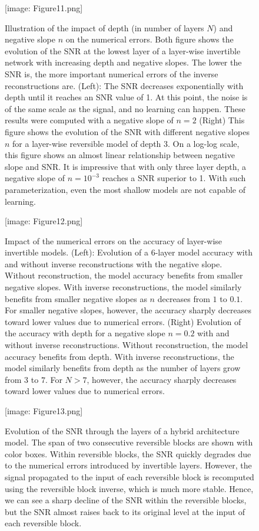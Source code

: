 \documentclass[twocolumn]{bmcart}
\def\texttt{[image: ]}
\begin{document}
\begin{backmatter}
\begin{figure}[t]
\texttt{[image: Figure11.png]}
\caption{
Illustration of the impact of depth (in number of layers $N$) and negative slope $n$ on the numerical errors.
Both figure shows the evolution of the SNR at the lowest layer of a layer-wise invertible network with increasing depth and negative slopes.
The lower the SNR is, the more  important numerical errors of the inverse reconstructions are. 
(Left): The SNR decreases exponentially with depth until it reaches an SNR value of 1. 
At this point, the noise is of the same scale as the signal, and no learning can happen.
These results were computed with a negative slope of $n=2$
(Right) This figure shows the evolution of the SNR with different negative slopes $n$ for a layer-wise reversible model of depth 3.
On a log-log scale, this figure shows an almost linear relationship between negative slope and SNR.
It is impressive that with only three layer depth, a negative slope of $n=10^{-3}$ reaches a SNR superior to 1.
With such parameterization, even the most shallow models are not capable of learning.
}
\end{figure}

\begin{figure}[t]
\texttt{[image: Figure12.png]}
\caption{
Impact of the numerical errors on the accuracy of layer-wise invertible models.
(Left): Evolution of a 6-layer model accuracy with and without inverse reconstructions with the negative slope.
Without reconstruction, the model accuracy benefits from smaller negative slopes.
With inverse reconstructions, the model similarly benefits from smaller negative slopes as $n$ decreases from $1$ to $0.1$.
For smaller negative slopes, however, the accuracy sharply decreases toward lower values due to numerical errors.
(Right) Evolution of the accuracy with depth for a negative slope $n=0.2$ with and without inverse reconstructions.
Without reconstruction, the model accuracy benefits from depth.
With inverse reconstructions, the model similarly benefits from depth as the number of layers grow from $3$ to $7$.
For $N>7$, however, the accuracy sharply decreases toward lower values due to numerical errors.
}
\end{figure}

\begin{figure}[t]
\texttt{[image: Figure13.png]}
\caption{
Evolution of the SNR through the layers of a hybrid architecture model.
The span of two consecutive reversible blocks are shown with color boxes.
Within reversible blocks, the SNR quickly degrades due to the numerical errors introduced by invertible layers.
However, the signal propagated to the input of each reversible block is recomputed using the reversible block inverse, which is much more stable.
Hence, we can see a sharp decline of the SNR within the reversible blocks, but the SNR almost raises back to its original level at the input of each reversible block. 
}
\end{figure}



\end{backmatter}
\end{document}
